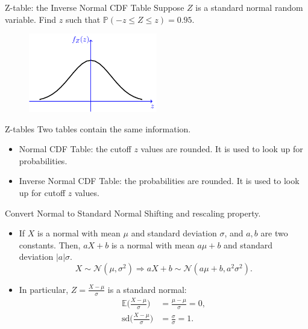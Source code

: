 \documentclass{beamer}
\newcommand{\pr}{\mathbb{P}}
\newcommand{\E}{\mathbb{E}}
\newcommand{\sd}{\text{sd}}
\begin{document}
\begin{frame}{Z-table: the Inverse Normal CDF Table}
    Suppose $Z$ is a standard normal random variable. 
    Find $z$ such that $\pr(-z \leq Z \leq z) =0.95$.


\begin{figure}
    \includegraphics[width=0.5\textwidth]{figures/empty_pdf.png}
\end{figure}
\end{frame}

\begin{frame}{Z-tables}
    Two tables contain the same information. 
    \begin{itemize}
        \item Normal CDF Table: the cutoff \alert{$z$ values} are rounded. It is used to look up for probabilities.
        \item Inverse Normal CDF Table: the \alert{probabilities} are rounded. It is used to look up for cutoff $z$ values.
    \end{itemize}
\end{frame}

\begin{frame}{Convert Normal to Standard Normal}
    Shifting and rescaling property.
    \begin{itemize}
        \item If $X$ is a \alert{normal} with mean $\mu$ and standard deviation $\sigma$, and $a,b$ are two constants. 
            Then, 
            $aX+b$ is a \alert{normal} with mean $a\mu+b$ and standard deviation $|a|\sigma$.
            $$ X \sim \mathcal{N}(\mu,\sigma^2) \Rightarrow aX+b \sim \mathcal{N}(a\mu+b,a^2\sigma^2).$$
        \item In particular, $Z=\frac{X-\mu}{\sigma}$ is a standard normal:
            \begin{align*}
                \E\big(\frac{X-\mu}{\sigma}\big) &= \frac{\mu-\mu}{\sigma}=0,\\
                \sd\big(\frac{X-\mu}{\sigma}\big) &= \frac{\sigma}{\sigma} =1.
            \end{align*}
    \end{itemize}
\end{frame}
\end{document}
